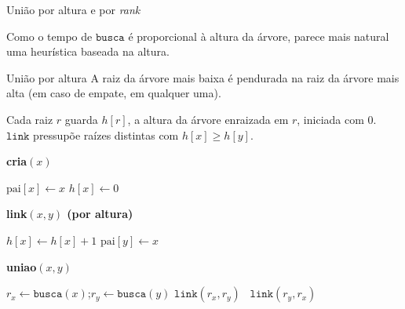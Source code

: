 \documentclass[aspectratio=169,10pt]{beamer}
\newcommand{\Busca}{\mathtt{busca}}
\newcommand{\Link}{\mathtt{link}}
\begin{document}
\begin{frame}[c]{União por altura e por \textit{rank}}

  Como o tempo de $\Busca$ é proporcional à altura da árvore, parece
  mais natural uma heurística baseada na altura. \pause
  \begin{block}{União por altura}
    A raiz da árvore mais baixa é pendurada na raiz da árvore mais alta
    (em caso de empate, em qualquer uma).
  \end{block}
  Cada raiz $r$ guarda $h[r]$, a altura da árvore enraizada em $r$,
  iniciada com $0$.  $\Link$ pressupõe raízes distintas com
  $h[x]\geq h[y]$.

  \medskip
  \begin{minipage}[t]{.3\linewidth}
    \textbf{cria$(x)$}
    \begin{algorithmic}[1]
      \State $\mathrm{pai}[x]\gets x$
      \State $h[x]\gets0$
    \end{algorithmic}
  \end{minipage}
  \hfill
  \begin{minipage}[t]{.37\linewidth}
    \textbf{link$(x,y)$ (por altura)}
    \begin{algorithmic}[1]
       \State $h[x]\gets h[x]+1$ \EndIf
      \State $\mathrm{pai}[y]\gets x$
    \end{algorithmic}
  \end{minipage}
  \hfill
  \begin{minipage}[t]{.3\linewidth}
    \textbf{uniao$(x,y)$}
    \begin{algorithmic}[1]
      \State $r_x\gets\Busca(x)$;\State  $r_y\gets\Busca(y)$
       \State $\Link(r_x,r_y)$
      \Else\ \State $\Link(r_y,r_x)$ \EndIf
    \end{algorithmic}
  \end{minipage}
 \hfill \hfill
 \hfill \hfill
 \end{frame}
\end{document}
